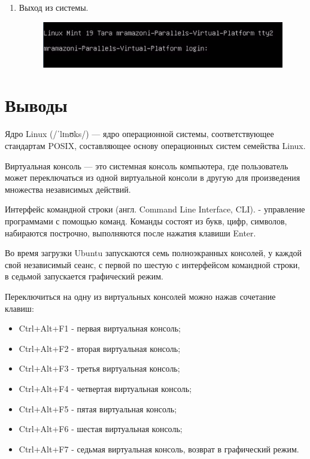 \begin{enumerate}
\begin{figure}[h]
		\centering
	\end{figure}
	\item Выход из системы.
	\begin{figure}[h]
		\includegraphics{lab1_1.png}
		\centering
	\end{figure}
\end{enumerate}

\section{Выводы}
	Ядро Linux (/ˈlɪnʊks/) — ядро операционной системы, соответствующее стандартам POSIX, составляющее основу операционных систем семейства Linux.
	
	
	Виртуальная консоль — это системная консоль компьютера, где пользователь может переключаться из одной виртуальной консоли в другую для произведения множества независимых действий.
	
	
	Интерфейс командной строки (англ. Command Line Interface, CLI). - управление программами с помощью команд. Команды состоят из букв, цифр, символов, набираются построчно, выполняются после нажатия клавиши Enter.
	
	
	Во время загрузки Ubuntu запускаются семь полноэкранных консолей, у каждой свой независимый сеанс, с первой по шестую с интерфейсом командной строки, в седьмой запускается графический режим.


	Переключиться на одну из виртуальных консолей можно нажав сочетание клавиш:
\begin{itemize}
 
	\item Ctrl+Alt+F1 - первая виртуальная консоль; 
	\item Ctrl+Alt+F2 - вторая виртуальная консоль; 
	\item Ctrl+Alt+F3 - третья виртуальная консоль; 
	\item Ctrl+Alt+F4 - четвертая виртуальная консоль; 
	\item Ctrl+Alt+F5 - пятая виртуальная консоль; 
	\item Ctrl+Alt+F6 - шестая виртуальная консоль; 
	\item Ctrl+Alt+F7 - седьмая виртуальная консоль, возврат в графический режим. 

\end{itemize} 


